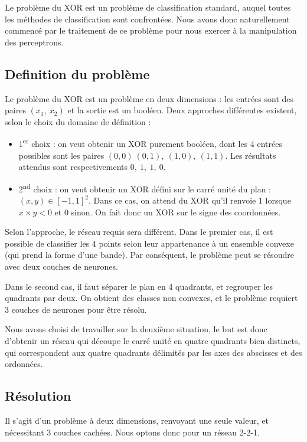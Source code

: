 Le problème du XOR est un problème de classification standard, auquel toutes les méthodes de classification sont confrontées. Nous avons donc naturellement commencé par le traitement de ce problème pour nous exercer à la manipulation des perceptrons.

\subsection{Definition du problème}

Le problème du XOR est un problème en deux dimensions : les entrées sont des paires $(x_1,\ x_2)$ et la sortie est un booléen. Deux approches différentes existent, selon le choix du domaine de définition : 

\begin{itemize}
  \item 1\textsuperscript{er} choix : on veut obtenir un XOR purement booléen, dont les 4 entrées possibles sont les paires $(0,0)\ (0,1),\ (1,0),\ (1,1)$. Les résultats attendus sont respectivements $0,\ 1,\ 1,\ 0$.
  \item 2\textsuperscript{nd} choix : on veut obtenir un XOR défini sur le carré unité du plan : ${(x,y) \in [-1,1]^2}$. Dans ce cas, on attend du XOR qu'il renvoie $1$ lorsque $x \times y < 0$ et $0$ sinon. On fait donc un XOR sur le signe des coordonnées.
\end{itemize}

Selon l'approche, le réseau requis sera différent. Dans le premier cas, il est possible de classifier les 4 points selon leur appartenance à un ensemble convexe (qui prend la forme d'une bande). Par conséquent, le problème peut se résoudre avec deux couches de neurones.

Dans le second cas, il faut séparer le plan en 4 quadrants, et regrouper les quadrants par deux. On obtient des classes non convexes, et le problème requiert 3 couches de neurones pour être résolu.

Nous avons choisi de travailler sur la deuxième situation, le but est donc d'obtenir un réseau qui découpe le carré unité en quatre quadrants bien distincts, qui correspondent aux quatre quadrants délimités par les axes des abscisses et des ordonnées.

\subsection{Résolution}

Il s'agit d'un problème à deux dimensions, renvoyant une seule valeur, et nécessitant 3 couches cachées. Nous optons donc pour un réseau 2-2-1. 

